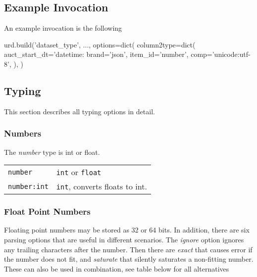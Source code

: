 


\subsection{Example Invocation}
An example invocation is the following

\begin{python}
urd.build('dataset_type', ...,
  options=dict(
    column2type=dict(
      auct_start_dt='datetime:%
      brand='json',
      item_id='number',
      comp='unicode:utf-8',
    ),
  )
\end{python}



\subsection{Typing}
This section describes all typing options in detail.

\subsubsection{Numbers}
The \emph{number} type is int or float.\\

\begin{tabular}{ll}
  \texttt{number}     & \texttt{int} or \texttt{float}\\
  \texttt{number:int} & \texttt{int}, converts floats to int.\\
\end{tabular}



\subsubsection{Float Point Numbers}
Floating point numbers may be stored as 32 or 64 bits.  In addition,
there are six parsing options that are useful in different scenarios.
The \emph{ignore} option ignores any trailing characters after the
number.  Then there are \emph{exact} that causes error if the number
does not fit, and \emph{saturate} that silently saturates a
non-fitting number.  These can also be used in combination, see table
below for all alternatives\\

